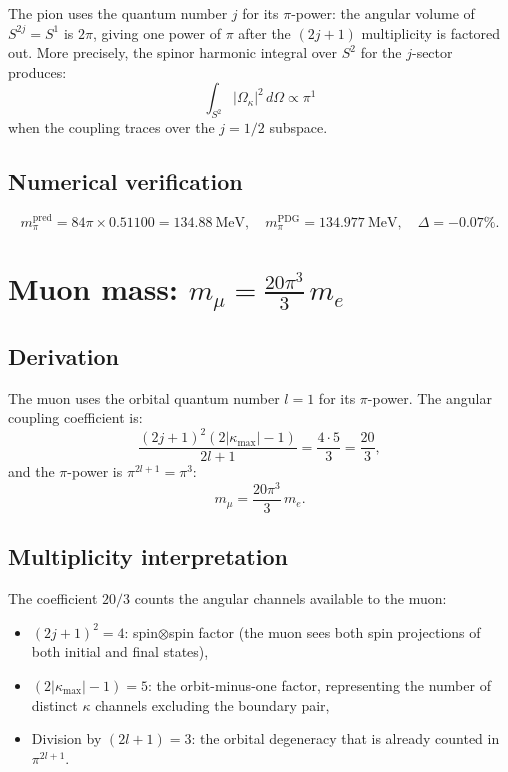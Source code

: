 \documentclass[11pt,letterpaper]{article}
\numberwithin{equation}{section}
\begin{document}
The pion uses the quantum number $j$ for its $\pi$-power:
the angular volume of $S^{2j} = S^1$ is $2\pi$, giving one power of $\pi$
after the $(2j+1)$ multiplicity is factored out. More precisely, the spinor
harmonic integral over $S^2$ for the $j$-sector produces:
\begin{equation}
  \int_{S^2} |\Omega_\kappa|^2 \, d\Omega \propto \pi^1
\end{equation}
when the coupling traces over the $j = 1/2$ subspace.

\subsection{Numerical verification}

\begin{equation}
  m_\pi^\mathrm{pred} = 84\pi \times 0.51100 = 134.88~\mathrm{MeV},
  \quad m_\pi^\mathrm{PDG} = 134.977~\mathrm{MeV},
  \quad \Delta = -0.07\%.
\end{equation}

\section{Muon mass: $m_\mu = \frac{20\pi^3}{3}\,m_e$}
\label{sec:muon}

\subsection{Derivation}

The muon uses the orbital quantum number $l = 1$ for its $\pi$-power.
The angular coupling coefficient is:
\begin{equation}
\label{eq:muon_coeff}
  \frac{(2j+1)^2(2|\kappa_\mathrm{max}|-1)}{2l+1}
  = \frac{4 \cdot 5}{3} = \frac{20}{3},
\end{equation}
and the $\pi$-power is $\pi^{2l+1} = \pi^3$:
\begin{equation}
\label{eq:m_mu}
\boxed{
  m_\mu = \frac{20\pi^3}{3}\,m_e.
}
\end{equation}

\subsection{Multiplicity interpretation}

The coefficient $20/3$ counts the angular channels available to the muon:
\begin{itemize}
  \item $(2j+1)^2 = 4$: spin$\otimes$spin factor (the muon sees both
    spin projections of both initial and final states),
  \item $(2|\kappa_\mathrm{max}|-1) = 5$: the orbit-minus-one factor,
    representing the number of distinct $\kappa$ channels excluding the
    boundary pair,
  \item Division by $(2l+1) = 3$: the orbital degeneracy that is already
    counted in $\pi^{2l+1}$.
\end{itemize}
\end{document}
